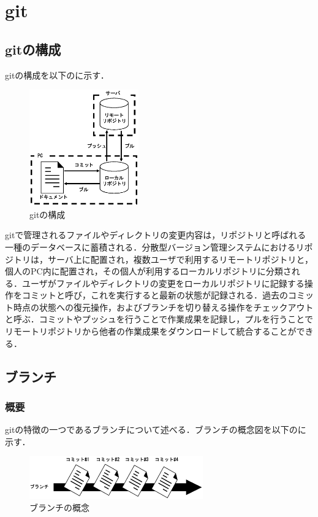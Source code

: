 \documentclass[a4paper,9pt,twocolumn]{jsarticle}
\begin{document}
\section{git}
\subsection{gitの構成}
gitの構成を以下のに示す．

\begin{figure}[h]
\centering
\includegraphics[height=50mm]{img/git.eps}
\caption{gitの構成}
\label{git}
\end{figure}

gitで管理されるファイルやディレクトリの変更内容は，リポジトリと呼ばれる一種のデータベースに蓄積される．分散型バージョン管理システムにおけるリポジトリは，サーバ上に配置され，複数ユーザで利用するリモートリポジトリと，個人のPC内に配置され，その個人が利用するローカルリポジトリに分類される．ユーザがファイルやディレクトリの変更をローカルリポジトリに記録する操作をコミットと呼び，これを実行すると最新の状態が記録される．過去のコミット時点の状態への復元操作，およびブランチを切り替える操作をチェックアウトと呼ぶ．コミットやプッシュを行うことで作業成果を記録し，プルを行うことでリモートリポジトリから他者の作業成果をダウンロードして統合することができる．

\subsection{ブランチ}
\subsubsection{概要}
gitの特徴の一つであるブランチについて述べる．ブランチの概念図を以下のに示す．

\begin{figure}[h]
\centering
\includegraphics[width=75mm]{img/branch1.eps}
\caption{ブランチの概念}
\label{branch}
\end{figure}
\end{document}
